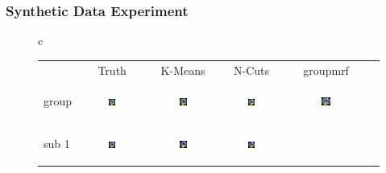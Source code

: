 \documentclass[serif]{beamer}
\begin{document}
\begin{frame}
\frametitle{Synthetic Data Experiment}
\begin{figure}[htb]
  \begin{tabular}[b]{c}
    \begin{tabular}[b]{lccccc}
      & \footnotesize Truth & \footnotesize \textsf{K-Means} & \footnotesize \textsf{N-Cuts} & \footnotesize \textsf{groupmrf}\\
      \begin{sideways} \footnotesize group \end{sideways} &
      \includegraphics[width=0.12\textwidth]{figure1/truegrp} &
      \includegraphics[width=0.12\textwidth]{figure1/kmeans_grp} &
      \includegraphics[width=0.12\textwidth]{figure1/ncuts_grp} &
      \includegraphics[width=0.12\textwidth]{figure1/mrf_grp} \\
      \begin{sideways} \footnotesize sub 1 \end{sideways} &
      \includegraphics[width=0.12\textwidth]{figure1/true_sub1} &
      \includegraphics[width=0.12\textwidth]{figure1/kmeans_sub1} &
      \includegraphics[width=0.12\textwidth]{figure1/ncuts_sub1} &

\end{tabular}
\end{tabular}
\end{figure}
\end{frame}
\end{document}
